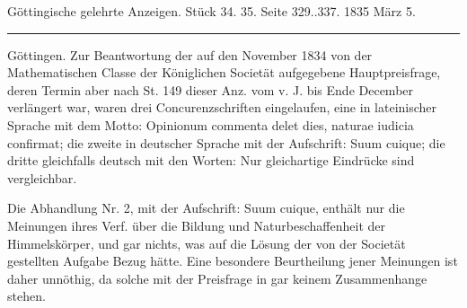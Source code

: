 \clearpage
\begingroup
\pagestyle{empty}
\thispagestyle{empty}
\noindent{}%
\makebox[12mm][l]{}%
%
\par\medskip
\begin{center}\small Göttingische gelehrte Anzeigen. Stück 34. 35. Seite 329..337. 1835 März 5.\\[3pt]\rule{.72\linewidth}{.3pt}\end{center}

Göttingen. Zur Beantwortung der auf den November 1834 von der Mathematischen Classe der Königlichen Societät aufgegebene Hauptpreisfrage, deren Termin aber nach St. 149 dieser Anz. vom v. J. bis Ende December verlängert war, waren drei Concurenzschriften eingelaufen, eine in lateinischer Sprache mit dem Motto: Opinionum commenta delet dies, naturae iudicia confirmat; die zweite in deutscher Sprache mit der Aufschrift: Suum cuique; die dritte gleichfalls deutsch mit den Worten: Nur gleichartige Eindrücke sind vergleichbar.

Die Abhandlung Nr. 2, mit der Aufschrift: Suum cuique, enthält nur die Meinungen ihres Verf. über die Bildung und Naturbeschaffenheit der Himmelskörper, und gar nichts, was auf die Lösung der von der Societät gestellten Aufgabe Bezug hätte. Eine besondere Beurtheilung jener Meinungen ist daher unnöthig, da solche mit der Preisfrage in gar keinem Zusammenhange stehen.

